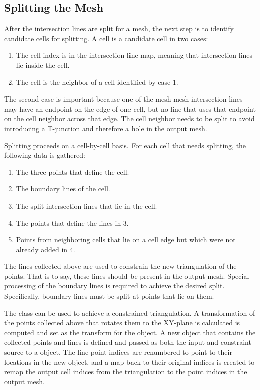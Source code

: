 \documentclass{InsightArticle}
\begin{document}
\subsection{Splitting the Mesh}

After the intersection lines are split for a mesh, the next step is to identify candidate cells for splitting. A cell is a candidate cell in two cases:

\begin{enumerate}
\item The cell index is in the intersection line map, meaning that intersection lines lie inside the cell.
\item The cell is the neighbor of a cell identified by case 1.
\end{enumerate}

The second case is important because one of the mesh-mesh intersection lines may have an endpoint on the edge of one cell, but no line that uses that endpoint on the cell neighbor across that edge. The cell neighbor needs to be split to avoid introducing a T-junction and therefore a hole in the output mesh.

Splitting proceeds on a cell-by-cell basis. For each cell that needs splitting, the following data is gathered:

\begin{enumerate}
\item The three points that define the cell.
\item The boundary lines of the cell.
\item The split intersection lines that lie in the cell.
\item The points that define the lines in 3.
\item Points from neighboring cells that lie on a cell edge but which were not already added in 4.
\end{enumerate}

The lines collected above are used to constrain the new triangulation of the points. That is to say, these lines should be present in the output mesh. Special processing of the boundary lines is required to achieve the desired split. Specifically, boundary lines must be split at points that lie on them.

The  class can be used to achieve a constrained triangulation. A transformation of the points collected above that rotates them to the XY-plane is calculated is computed and set as the transform for the  object. A new  object that contains the collected points and lines is defined and passed as both the input and constraint source to a  object. The line point indices are renumbered to point to their locations in the new  object, and a map back to their original indices is created to remap the output cell indices from the triangulation to the point indices in the output mesh.
\end{document}
